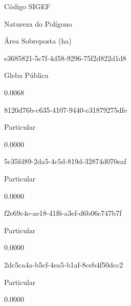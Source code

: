 \documentclass[
  11pt,
  a4paper,
  DIV=11,
  numbers=noendperiod]{scrartcl}
\begin{document}
\n  

\n    

\n      

Código SIGEF

\n      

Natureza do Polígono

\n      

Área Sobreposta (ha)

\n    

\n  

\n  

\n    

\n      

e3685821-5c7f-4d58-9296-75f2d822d1d8

\n      

Gleba Pública

\n      

0.0068

\n    

\n    

\n      

8120d76b-c635-4107-9440-c31879275dfe

\n      

Particular

\n      

0.0000

\n    

\n    

\n      

5c35fd89-2da5-4c5d-819d-32874d070eaf

\n      

Particular

\n      

0.0000

\n    

\n    

\n      

f2e69c4e-ae18-41f6-a3ef-d6b06c747b7f

\n      

Particular

\n      

0.0000

\n    

\n    

\n      

2dc5ca4a-b5cf-4ea5-b1af-8ceb4f50dcc2

\n      

Particular

\n      

0.0000
\end{document}
